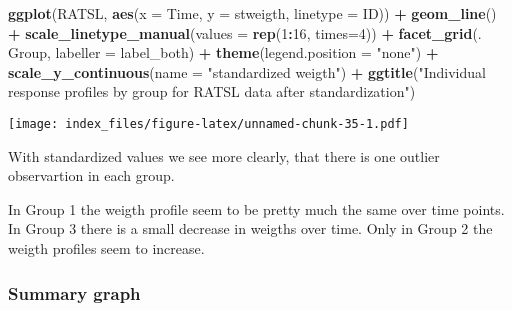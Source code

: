 \documentclass[]{article}
\newenvironment{Shaded}{\begin{snugshade}}{\end{snugshade}}
\newcommand{\KeywordTok}[1]{\textcolor[rgb]{0.13,0.29,0.53}{\textbf{#1}}}
\newcommand{\DataTypeTok}[1]{\textcolor[rgb]{0.13,0.29,0.53}{#1}}
\newcommand{\DecValTok}[1]{\textcolor[rgb]{0.00,0.00,0.81}{#1}}
\newcommand{\StringTok}[1]{\textcolor[rgb]{0.31,0.60,0.02}{#1}}
\newcommand{\CommentTok}[1]{\textcolor[rgb]{0.56,0.35,0.01}{\textit{#1}}}
\newcommand{\OperatorTok}[1]{\textcolor[rgb]{0.81,0.36,0.00}{\textbf{#1}}}
\newcommand{\NormalTok}[1]{#1}
\begin{document}
\begin{Shaded}
\begin{Highlighting}[]
\KeywordTok{ggplot}\NormalTok{(RATSL, }\KeywordTok{aes}\NormalTok{(}\DataTypeTok{x =}\NormalTok{ Time, }\DataTypeTok{y =}\NormalTok{ stweigth, }\DataTypeTok{linetype =}\NormalTok{ ID)) }\OperatorTok{+}
\StringTok{  }\KeywordTok{geom_line}\NormalTok{() }\OperatorTok{+}
\StringTok{  }\KeywordTok{scale_linetype_manual}\NormalTok{(}\DataTypeTok{values =} \KeywordTok{rep}\NormalTok{(}\DecValTok{1}\OperatorTok{:}\DecValTok{16}\NormalTok{, }\DataTypeTok{times=}\DecValTok{4}\NormalTok{)) }\OperatorTok{+}
\StringTok{  }\KeywordTok{facet_grid}\NormalTok{(. }\OperatorTok{~}\StringTok{ }\NormalTok{Group, }\DataTypeTok{labeller =}\NormalTok{ label_both) }\OperatorTok{+}
\StringTok{  }\KeywordTok{theme}\NormalTok{(}\DataTypeTok{legend.position =} \StringTok{"none"}\NormalTok{) }\OperatorTok{+}\StringTok{ }
\StringTok{  }\KeywordTok{scale_y_continuous}\NormalTok{(}\DataTypeTok{name =} \StringTok{"standardized weigth"}\NormalTok{) }\OperatorTok{+}
\StringTok{  }\KeywordTok{ggtitle}\NormalTok{(}\StringTok{"Individual response profiles by group for RATSL data after standardization"}\NormalTok{)}
\end{Highlighting}
\end{Shaded}

\texttt{[image: index\_files/figure-latex/unnamed-chunk-35-1.pdf]}

With standardized values we see more clearly, that there is one outlier
observartion in each group.

In Group 1 the weigth profile seem to be pretty much the same over time
points. In Group 3 there is a small decrease in weigths over time. Only
in Group 2 the weigth profiles seem to increase.

\subsubsection{Summary graph}\label{summary-graph}

\begin{Shaded}
\end{Shaded}
\end{document}
